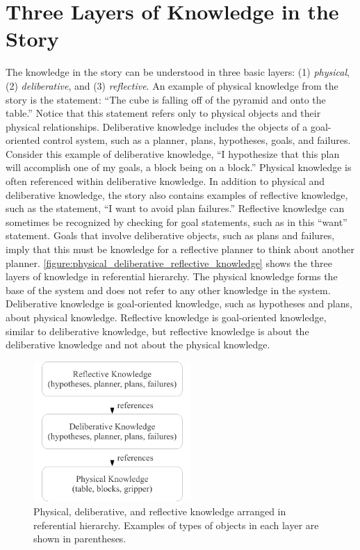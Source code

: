 \section{Three Layers of Knowledge in the Story}

The knowledge in the story can be understood in three basic layers:
(1) {\emph{physical}}, (2) {\emph{deliberative}}, and (3)
{\emph{reflective}}.  An example of physical knowledge from the story
is the statement: ``The cube is falling off of the pyramid and onto
the table.''  Notice that this statement refers only to physical
objects and their physical relationships.  Deliberative knowledge
includes the objects of a goal-oriented control system, such as a
planner, plans, hypotheses, goals, and failures.  Consider this
example of deliberative knowledge, ``I hypothesize that this plan will
accomplish one of my goals, a block being on a block.''  Physical
knowledge is often referenced within deliberative knowledge.  In
addition to physical and deliberative knowledge, the story also
contains examples of reflective knowledge, such as the statement, ``I
want to avoid plan failures.''  Reflective knowledge can sometimes be
recognized by checking for goal statements, such as in this ``want''
statement.  Goals that involve deliberative objects, such as plans and
failures, imply that this must be knowledge for a reflective planner
to think about another planner.
{\autoref{figure:physical_deliberative_reflective_knowledge}} shows
the three layers of knowledge in referential hierarchy.  The physical
knowledge forms the base of the system and does not refer to any other
knowledge in the system.  Deliberative knowledge is goal-oriented
knowledge, such as hypotheses and plans, about physical knowledge.
Reflective knowledge is goal-oriented knowledge, similar to
deliberative knowledge, but reflective knowledge is about the
deliberative knowledge and not about the physical knowledge.
\begin{figure}
  \center
  \includegraphics[width=6cm]{gfx/physical_deliberative_reflective_knowledge}
  \caption{Physical, deliberative, and reflective knowledge arranged
    in referential hierarchy.  Examples of types of objects in each
    layer are shown in parentheses.}
  \label{figure:physical_deliberative_reflective_knowledge}
\end{figure}

